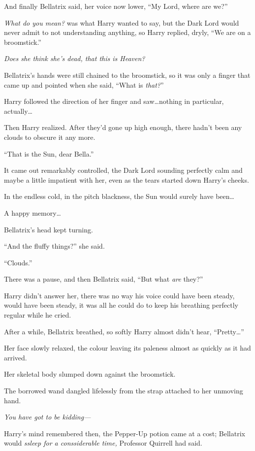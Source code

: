 And finally Bellatrix said, her voice now lower, “My Lord, where are we?”

\emph{What do you mean?} was what Harry wanted to say, but the Dark Lord would never admit to not understanding anything, so Harry replied, dryly, “We are on a broomstick.”

\emph{Does she think she’s dead, that this is Heaven?}

Bellatrix’s hands were still chained to the broomstick, so it was only a finger that came up and pointed when she said, “What is \emph{that?}”

Harry followed the direction of her finger and saw…nothing in
particular, actually…

Then Harry realized. After they’d gone up high enough, there hadn’t been any clouds to obscure it any more.

“That is the Sun, dear Bella.”

It came out remarkably controlled, the Dark Lord sounding perfectly calm and maybe a little impatient with her, even as the tears started down Harry’s cheeks.

In the endless cold, in the pitch blackness, the Sun would surely have been…

A happy memory…

Bellatrix’s head kept turning.

“And the fluffy things?” she said.

“Clouds.”

There was a pause, and then Bellatrix said, “But what \emph{are} they?”

Harry didn’t answer her, there was no way his voice could have been steady, would have been steady, it was all he could do to keep his breathing perfectly regular while he cried.

After a while, Bellatrix breathed, so softly Harry almost didn’t hear, “Pretty…”

Her face slowly relaxed, the colour leaving its paleness almost as quickly as it had arrived.

Her skeletal body slumped down against the broomstick.

The borrowed wand dangled lifelessly from the strap attached to her unmoving hand.

\emph{You have \emph{got} to be \emph{kidding}—}

Harry’s mind remembered then, the Pepper-Up potion came at a cost; Bellatrix would \emph{ssleep for a conssiderable time,} Professor Quirrell had said.

